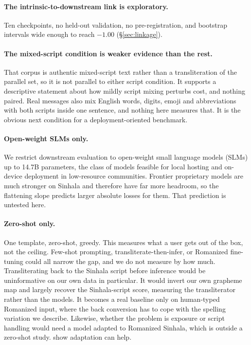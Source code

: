 \documentclass{article}
\begin{document}
\paragraph{The intrinsic-to-downstream link is exploratory.} Ten checkpoints, no
held-out validation, no pre-registration, and bootstrap intervals wide enough to
reach $-1.00$ (\S\ref{sec:linkage}).

\paragraph{The mixed-script condition is weaker evidence than the rest.} That corpus
is authentic mixed-script text rather than a transliteration of the parallel set, so
it is not parallel to either script condition. It supports a descriptive statement
about how mildly script mixing perturbs cost, and nothing paired. Real messages also mix
English words, digits, emoji and abbreviations with both scripts inside one sentence, and
nothing here measures that. It is the obvious next condition for a deployment-oriented
benchmark.

\paragraph{Open-weight SLMs only.} We restrict downstream evaluation to open-weight
small language models (SLMs) up to 14.7B parameters, the class of models feasible
for local hosting and on-device deployment in low-resource communities. Frontier
proprietary models are much stronger on Sinhala
\citep{pramodya-etal-2025-sinhalammlu} and therefore have far more headroom, so the
flattening slope predicts larger absolute losses for them. That prediction is
untested here.

\paragraph{Zero-shot only.} One template, zero-shot, greedy. This measures what a
user gets out of the box, not the ceiling. Few-shot prompting,
transliterate-then-infer, or Romanized fine-tuning could all narrow the gap, and we
do not measure by how much. Transliterating back to the Sinhala script before inference
would be uninformative on our own data in particular. It would invert our own grapheme map
and largely recover the Sinhala-script score, measuring the transliterator rather than the
models. It becomes a real baseline only on human-typed Romanized input, where the back
conversion has to cope with the spelling variation we describe. Likewise, whether the
problem is exposure or script handling would need a model adapted to Romanized Sinhala,
which is outside a zero-shot study. \citet{j-etal-2024-romansetu} show adaptation can help.
\end{document}

